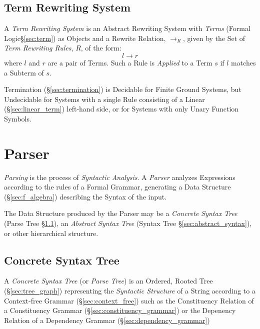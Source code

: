 \subsection{Term Rewriting System}\label{sec:term_rewriting}

A \emph{Term Rewriting System} is an Abstract Rewriting System with
\emph{Terms} (Formal Logic\S\ref{sec:term}) as Objects and a Rewrite
Relation, $\rightarrow_R$, given by the Set of \emph{Term Rewriting
  Rules}, $R$, of the form:
\[
  l \rightarrow r
\]
where $l$ and $r$ are a pair of Terms. Such a Rule is \emph{Applied}
to a Term $s$ if $l$ matches a Subterm of $s$.

Termination (\S\ref{sec:termination}) is Decidable for Finite Ground
Systems, but Undecidable for Systems with a single Rule consisting of
a Linear (\S\ref{sec:linear_term}) left-hand side, or for Systems with
only Unary Function Symbols. %



\section{Parser} \label{sec:parser}

\emph{Parsing} is the process of \emph{Syntactic Analysis}. A
\emph{Parser} analyzes Expressions according to the rules of a Formal
Grammar, generating a Data Structure (\S\ref{sec:f_algebra})
describing the Syntax of the input.

The Data Structure produced by the Parser may be a \emph{Concrete
  Syntax Tree} (Parse Tree \S\ref{sec:concrete_syntax}), an
\emph{Abstract Syntax Tree} (Syntax Tree \S\ref{sec:abstract_syntax}),
or other hierarchical structure.



\subsection{Concrete Syntax Tree}\label{sec:concrete_syntax}

A \emph{Concrete Syntax Tree} (or \emph{Parse Tree}) is an Ordered,
Rooted Tree (\S\ref{sec:tree_graph}) representing the \emph{Syntactic
  Structure} of a String according to a Context-free Grammar
(\S\ref{sec:context_free}) such as the Constituency Relation of a
Constituency Grammar (\S\ref{sec:constituency_grammar}) or the
Depenency Relation of a Dependency Grammar
(\S\ref{sec:dependency_grammar})



